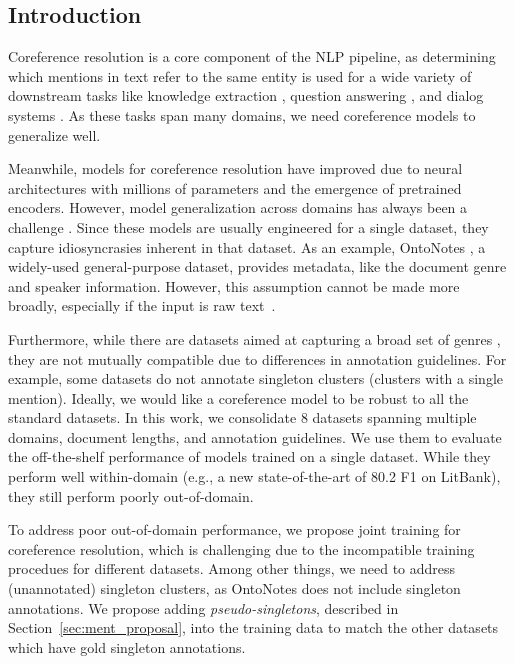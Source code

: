 \documentclass[12pt]{thesis-umich}[thesis]
\begin{document}
\subsection{Introduction}
Coreference resolution is a core component of the NLP pipeline, as determining which mentions in text refer to the same entity is used for a wide variety of downstream tasks like knowledge extraction \cite{li-etal-2020-gaia}, question answering \cite{dhingra-etal-2018-neural}, and dialog systems \cite{gao-etal-2019-interconnected}. 
As these tasks span many domains, we need coreference models to generalize well. 

Meanwhile, 
models for coreference resolution have improved due to neural architectures with millions of parameters and the emergence of pretrained encoders. However, model generalization across domains has always been a challenge \cite{yang-etal-2012-domain, zhao-ng-2014-domain, poot-van-cranenburgh-2020-benchmark, aktas-etal-2020-adapting, moosavi-thesis}. Since these models are usually engineered for a single dataset, they capture idiosyncrasies inherent in that dataset. As an example, OntoNotes \cite{weischedel2013ontonotes}, a widely-used general-purpose dataset, provides metadata, like the document genre and speaker information. However, this assumption cannot be made more broadly, especially if the input is raw text~\cite{wiseman-etal-2016-antecedent}. 



Furthermore, while there are datasets aimed at capturing a broad set of genres \cite{weischedel2013ontonotes, poesio-etal-2018-anaphora, zhu-etal-2021-ontogum}, they are not mutually compatible due to differences in annotation guidelines. For example, some datasets do not annotate singleton clusters (clusters with a single mention). Ideally, we would like a coreference model to be robust to all the standard datasets. 
In this work, we consolidate 8 datasets spanning multiple domains, document lengths, and annotation guidelines. We use them to evaluate the off-the-shelf performance of models trained on a single dataset. While they perform well within-domain (e.g., a new state-of-the-art of 80.2 F1 on LitBank), they still perform poorly out-of-domain. 

To address poor out-of-domain performance, we propose joint training for coreference resolution, which is challenging due to the incompatible training procedues for different datasets.  Among other things, we need to address (unannotated) singleton clusters, as OntoNotes does not include singleton annotations. We propose adding  \textit{pseudo-singletons}, described in Section~\ref{sec:ment_proposal}, into the training data to match the other datasets which have gold singleton annotations. 
\end{document}
